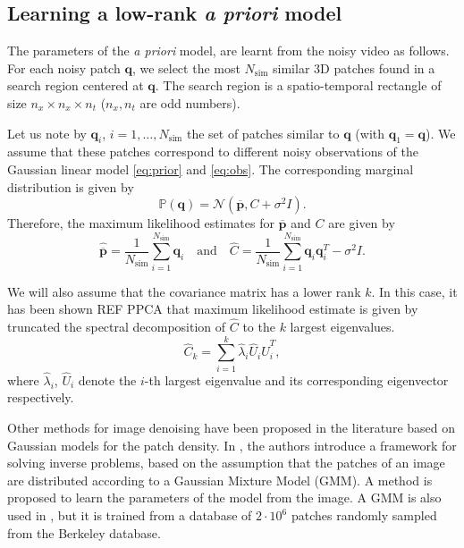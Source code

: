 \documentclass[10pt, journal, twocolumn, final, a4paper]{IEEEtran}
\newcommand{\ma}[1]{\boldsymbol{#1}}
\begin{document}
%

\subsection{Learning a low-rank \textit{a priori} model}

The parameters of the \textit{a priori} model, are learnt from the noisy video as
follows. For each noisy patch $\ma q$, we select the most $N_{\text{sim}}$
similar 3D patches found in a search region centered at $\ma q$. The
search region is a spatio-temporal rectangle of size $n_x \times
n_x \times n_t$ ($n_x, n_t$ are odd numbers). 

Let us note by $\ma q_i$, $i = 1, \dots, N_{\text{sim}}$ the set of patches
similar to $\ma q$ (with $\ma q_1 = \ma q$). We assume that these 
patches correspond to different noisy observations of the Gaussian linear model
\eqref{eq:prior} and \eqref{eq:obs}. The corresponding marginal distribution is given by
\[\mathds P(\ma q) = \mathcal N(\overline{\ma p}, C + \sigma^2I). \]
Therefore, the maximum likelihood estimates for $\overline{\ma p}$ and $C$ are given by 
\begin{equation}
	\widehat{\overline{\ma p}} = \frac1{N_{\text{sim}}}\sum_{i = 1}^{N_{\text{sim}}}\ma q_i \quad\text{and}\quad 
		\widehat C= \frac1{N_\text{sim}}\sum_{i = 1}^{N_{\text{sim}}}\ma q_i\ma q_i^T - \sigma^2I.
	\label{eq:learn_parameters}
\end{equation}

We will also assume that the covariance matrix has a lower rank $k$.  In this
case, it has been shown REF PPCA that maximum likelihood estimate is given by
truncated the spectral decomposition of $\widehat C$ to the $k$ largest
eigenvalues.
\begin{equation}
\widehat C_k = \sum_{i = 1}^k\widehat \lambda_i\widehat U_i\widehat U_i^T,
\end{equation}
where $\widehat \lambda_i$, $\widehat U_i$ denote the $i$-th largest
eigenvalue and its corresponding eigenvector respectively.

\bigskip

Other methods for image denoising have been proposed in the
literature based on Gaussian models for the patch density. In \cite{Yu2012},
the authors introduce a framework for solving inverse problems, based on the
assumption that the patches of an image are distributed according to a Gaussian
Mixture Model (GMM). A method is proposed to learn the parameters of the model from
the image. A GMM is also used in \cite{Zoran2011}, but it is trained from a
database of $2\cdot 10^6$ patches randomly sampled from the Berkeley database.
\end{document}
